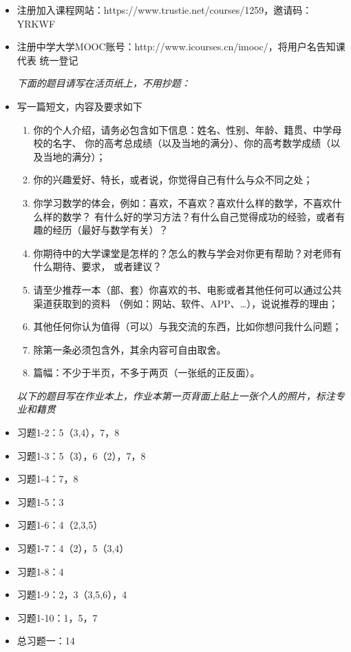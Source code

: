 \begin{itemize}
  \item 注册加入课程网站：https://www.trustie.net/courses/1259，邀请码：YRKWF
  \item 注册中学大学MOOC账号：http://www.icourses.cn/imooc/，将用户名告知课代表
  统一登记
  
  {\b\it 下面的题目请写在活页纸上，不用抄题：}
  \item 写一篇短文，内容及要求如下
  \begin{enumerate}[(1)]
    \item 你的个人介绍，请务必包含如下信息：姓名、性别、年龄、籍贯、中学母校的名字、
    你的高考总成绩（以及当地的满分）、你的高考数学成绩（以及当地的满分）；
    \item 你的兴趣爱好、特长，或者说，你觉得自己有什么与众不同之处；
    \item 你学习数学的体会，例如：喜欢，不喜欢？喜欢什么样的数学，不喜欢什么样的数学？
    有什么好的学习方法？有什么自己觉得成功的经验，或者有趣的经历（最好与数学有关）？
    \item 你期待中的大学课堂是怎样的？怎么的教与学会对你更有帮助？对老师有什么期待、要求，
    或者建议？
    \item 请至少推荐一本（部、套）你喜欢的书、电影或者其他任何可以通过公共渠道获取到的资料
    （例如：网站、软件、APP、\ldots），说说推荐的理由；
    \item 其他任何你认为值得（可以）与我交流的东西，比如你想问我什么问题；
    \item 除第一条必须包含外，其余内容可自由取舍。
    \item 篇幅：不少于半页，不多于两页（一张纸的正反面）。
  \end{enumerate}
  {\b\it 以下的题目写在作业本上，作业本第一页背面上贴上一张个人的照片，标注专业和籍贯}
  \item 习题1-2：5（3,4），7，8
  \item 习题1-3：5（3），6（2），7，8
  \item 习题1-4：7，8
  \item 习题1-5：3
  \item 习题1-6：4（2,3,5）
  \item 习题1-7：4（2），5（3,4）
  \item 习题1-8：4
  \item 习题1-9：2，3（3,5,6），4
  \item 习题1-10：1，5，7
  \item 总习题一：14
\end{itemize}

% 
% 
% 
% 
